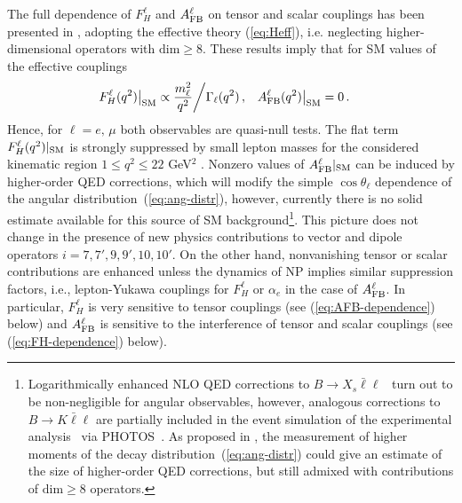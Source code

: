 \documentclass[twocolumn,epjc3]{svjour3}
\numberwithin{equation}{section}
\def \refeq#1{(\ref{#1})}
\renewcommand{\[}{\big[}
\renewcommand{\]}{\big]}
\renewcommand{\(}{\big(}
\renewcommand{\)}{\big)}
\begin{document}
The full dependence of $F_H^\ell$ and $A_{\rm FB}^\ell$ on tensor and
scalar couplings has been presented in \cite{Bobeth:2007dw,
  Bobeth:2012vn}, adopting the effective theory \refeq{eq:Heff},
i.e. neglecting higher-dimensional operators with {$\mbox{dim} \geq
  8$}. These results imply that for SM values of the effective
couplings
\begin{align}
  F_H^\ell(q^2) \big|_{\rm SM} & \propto \frac{m_\ell^2}{q^2}
    \bigg/ \Gamma_\ell(q^2) \,, &
  A_{\rm FB}^\ell(q^2) \big|_{\rm SM} & = 0 \,.
\end{align}
Hence, for $\ell = e,\, \mu$ both observables are quasi-null tests.
The flat term $F_H^\ell(q^2)|_{\rm SM}$ is strongly suppressed {by
  small lepton masses for the considered kinematic region $1 \leq
  q^2 \leq 22$ GeV$^2$} \cite{Bobeth:2007dw, Bobeth:2011nj,
  Bouchard:2013eph}.  Nonzero values of $A_{\rm FB}^\ell|_{\rm SM}$
can be induced by higher-order QED corrections, which will modify the
simple $\cos\theta_\ell$ dependence of the angular
distribution~\refeq{eq:ang-distr}, however, currently there is no
solid estimate available for this source of SM background\footnote{
  Logarithmically enhanced NLO QED corrections to $B\to X_s
  \bar\ell\ell$~\cite{Huber:2015sra} turn out to be non-negligible
  for angular observables,
  however, analogous corrections to $B\to K \bar\ell\ell$ are partially
  included in the event simulation of the experimental
  analysis~\cite{Aaij:2014tfa} via PHOTOS~\cite{Golonka:2005pn}.
  As proposed in \cite{Gratrex:2015hna}, the measurement of higher
  moments of the decay distribution~\refeq{eq:ang-distr} could give an
  estimate of the size of higher-order QED corrections, but still
  admixed with contributions of $\mbox{dim} \geq 8$ operators.}.
This picture does not change in the presence of new physics contributions to
vector and dipole operators $i = 7,7',9,9',10,10'$. On the other hand,
nonvanishing tensor or scalar contributions are enhanced unless the dynamics of
NP implies similar suppression factors, i.e., lepton-Yukawa couplings for
$F_H^\ell$ or $\alpha_e$ in the case of $A_{\rm FB}^\ell$. In particular,
$F_H^\ell$ is very sensitive to tensor couplings (see \refeq{eq:AFB-dependence}
below) and $A_{\rm FB}^\ell$ is sensitive to the interference of tensor and
scalar couplings (see \refeq{eq:FH-dependence} below).
\end{document}
